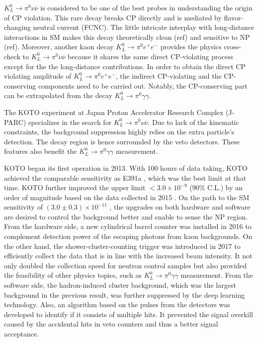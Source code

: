 ${K_L^0 \to \pi^0 \nu \overline{\nu}}$ is considered to be one of the best probes in understanding the origin of CP violation. This rare decay breaks CP directly and is mediated by flavor-changing neutral current (FCNC). The little intricate interplay with long-distance interactions in SM makes this decay theoretically clean (ref) and sensitive to NP (ref). Moreover, another kaon decay ${K_L^0 \to \pi^0 e^+ e^-}$ provides the physics cross-check to ${K_L^0 \to \pi^0 \nu \overline{\nu}}$ because it shares the same direct CP-violating process except for the the long-distance contributions. In order to obtain the direct CP violating amplitude of ${K_L^0 \to \pi^0 e^+ e^-}$, the indirect CP-violating and the CP-conserving components need to be carried out. Notably, the CP-conserving part can be extrapolated from the decay ${K_L^0 \to \pi^0 \gamma \gamma}$.



The KOTO experiment \parencite{KOTO_intro, KOTO_proposal} at Japan Proton Accelerator Research Complex (J-PARC) \parencite{JPARC_intro} specializes in the search for ${K_L^0 \to \pi^0 \nu \overline{\nu}}$. Due to lack of the kinematic constraints, the background suppression highly relies on the extra particle's detection. The decay region is hence surrounded by the veto detectors. These features also benefit the ${K_L^0 \to \pi^0 \gamma \gamma}$ measurement.

KOTO began its first operation in 2013. With 100 hours of data taking, KOTO achieved the comparable sensitivity as E391a \parencite{KOTO_2013, KLpi0nn_e391a}, which was the best limit at that time. KOTO further improved the upper limit ${<3.0\times 10^{-9}}$ (90\% C.L.) by an order of magnitude based on the data collected in 2015 \parencite{KOTO_2015}. On the path to the SM sensitivity of ${(3.0 \pm 0.3) \times 10^{-11}}$ \parencite{KLpi0nn_SM}, the upgrades on both hardware and software are desired to control the background better and enable to sense the NP region. From the hardware side, a new cylindrical barrel counter was installed in 2016 to complement detection power of the escaping photons from kaon backgrounds. On the other hand, the shower-cluster-counting trigger was introduced in 2017 to efficiently collect the data that is in line with the increased beam intensity. It not only doubled the collection speed for neutron control samples but also provided the feasibility of other physics topics, such as ${K_L^0 \to \pi^0 \gamma \gamma}$ measurement. From the software side, the hadron-induced cluster background, which was the largest background in the previous result, was further suppressed by the deep learning technology. Also, an algorithm based on the pulses from the detectors was developed to identify if it consists of multiple hits. It prevented the signal overkill caused by the accidental hits in veto counters and thus a better signal acceptance.

